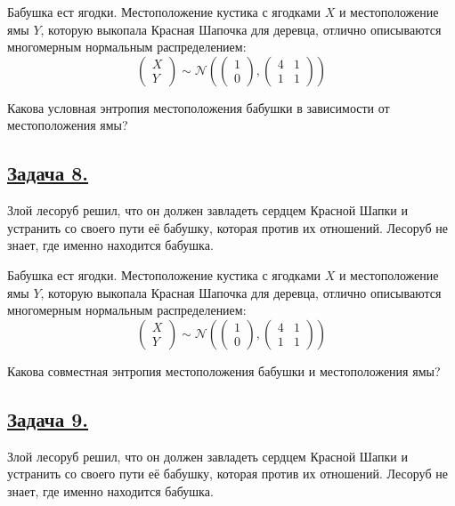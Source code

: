 Бабушка ест ягодки. Местоположение кустика с ягодками $X$ и местоположение ямы $Y$, которую выкопала Красная Шапочка для деревца, отлично описываются многомерным нормальным распределением:
\[\begin{pmatrix} 
    X \\ 
    Y 
  \end{pmatrix}\sim \mathcal{N}\left(\begin{pmatrix} 
      1 \\ 
      0
    \end{pmatrix},
    \begin{pmatrix} 
      4 & 1 \\ 
      1 & 1
    \end{pmatrix}\right)\]

Какова условная энтропия местоположения бабушки в зависимости от местоположения ямы?

\subsection*{\hyperref[sec:sol_problem8]{Задача 8.}}\label{sec:problem8} Злой лесоруб решил, что он должен завладеть сердцем Красной Шапки и устранить со своего пути её бабушку, которая против их отношений. Лесоруб не знает, где именно находится бабушка.

Бабушка ест ягодки. Местоположение кустика с ягодками $X$ и местоположение ямы $Y$, которую выкопала Красная Шапочка для деревца, отлично описываются многомерным нормальным распределением:
\[\begin{pmatrix} 
    X \\ 
    Y 
  \end{pmatrix}\sim \mathcal{N}\left(\begin{pmatrix} 
      1 \\ 
      0
    \end{pmatrix},
    \begin{pmatrix} 
      4 & 1 \\ 
      1 & 1
    \end{pmatrix}\right)\]

Какова совместная энтропия местоположения бабушки и местоположения ямы?

\subsection*{\hyperref[sec:sol_problem9]{Задача 9.}}\label{sec:problem9} Злой лесоруб решил, что он должен завладеть сердцем Красной Шапки и устранить со своего пути её бабушку, которая против их отношений. Лесоруб не знает, где именно находится бабушка.

